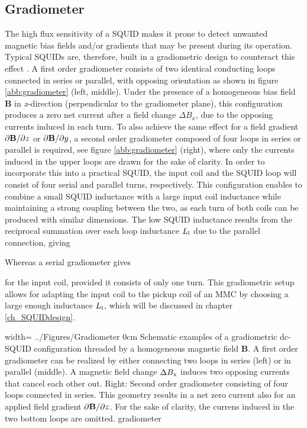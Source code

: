 \subsection{Gradiometer}\label{subsec_gradio}

The high flux sensitivity of a SQUID makes it prone to detect unwanted magnetic bias fields and/or gradients that may be present during its operation. Typical SQUIDs are, therefore, built in a gradiometric design to counteract this effect \cite{Ketchen1978}. A first order gradiometer consists of two identical conducting loops connected in series or parallel, with opposing orientation as shown in figure \ref{abb:gradiometer} (left, middle). Under the presence of a homogeneous bias field $\textbf{B}$ in \textit{x}-direction (perpendicular to the gradiometer plane), this configuration produces a zero net current after a field change $\Delta B_x$, due to the opposing currents induced in each turn. To also achieve the same effect for a field gradient $\partial \textbf{B}/\partial z$ or $\partial \textbf{B}/\partial y$, a second order gradiometer composed of four loops in series or parallel is required, see figure \ref{abb:gradiometer} (right), where only the currents induced in the upper loops are drawn for the sake of clarity. In order to incorporate this into a practical SQUID, the input coil and the SQUID loop will consist of four serial and parallel turns, respectively. This configuration enables to combine a small SQUID inductance with a large input coil inductance while maintaining a strong coupling between the two, as each turn of both coils can be produced with similar dimensions. The low SQUID inductance results from the reciprocal summation over each loop inductance $L_{\rm l}$ due to the parallel connection, giving


Whereas a serial gradiometer gives 


for the input coil, provided it consists of only one turn. This gradiometric setup allows for adapting the input coil to the pickup coil of an MMC by choosing a large enough inductance $L_{\rm i}$, which will be discussed in chapter \ref{ch_SQUIDdesign}. 

{width=\textwidth}
{../Figures/Gradiometer}
{0cm}   %
{Schematic examples of a gradiometric dc-SQUID configuration threaded by a homogeneous magnetic field $\textbf{B}$. A first order gradiometer can be realized by either connecting two loops in series (left) or in parallel (middle). A magnetic field change $\Delta B_{\rm x}$ induces two opposing currents that cancel each other out. Right: Second order gradiometer consisting of four loops connected in series. This geometry results in a net zero current also for an applied field gradient $\partial \textbf{B}/\partial z$. For the sake of clarity, the currens induced in the two bottom loops are omitted.}
{gradiometer}
   
